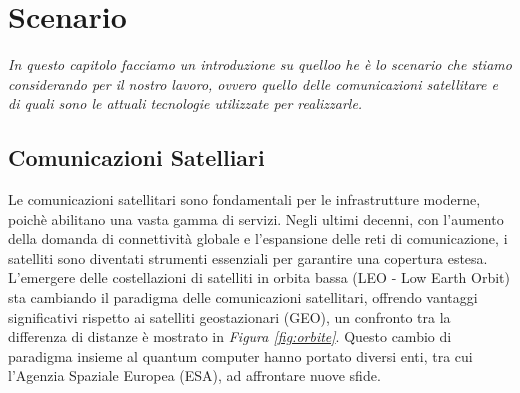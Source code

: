 
\chapter{Scenario} %

\label{Chapter3} %

\textit{In questo capitolo facciamo un introduzione su quelloo he è lo scenario che stiamo considerando per il nostro lavoro, ovvero 
quello delle comunicazioni satellitare e di quali sono le attuali tecnologie utilizzate per realizzarle.}


\section{Comunicazioni Satelliari}


Le comunicazioni satellitari sono fondamentali per le infrastrutture moderne, poichè abilitano una vasta gamma di servizi.
Negli ultimi decenni, con l'aumento della domanda di connettività globale e l'espansione delle reti di comunicazione, i satelliti sono diventati strumenti essenziali per garantire una copertura estesa.
L'emergere delle costellazioni di satelliti in orbita bassa (LEO - Low Earth Orbit) sta cambiando il paradigma delle comunicazioni satellitari, offrendo vantaggi significativi rispetto ai satelliti geostazionari (GEO), un confronto tra la differenza di distanze è mostrato in \textit{Figura \ref{fig:orbite}}. 
Questo cambio di paradigma insieme al quantum computer hanno portato diversi enti, tra cui l'Agenzia Spaziale Europea (ESA), ad affrontare nuove sfide.

